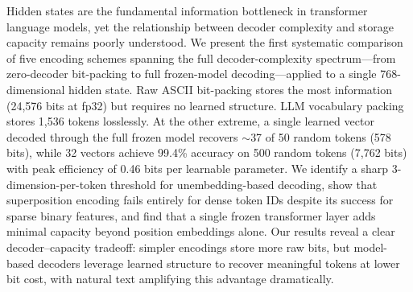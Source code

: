 Hidden states are the fundamental information bottleneck in transformer language models, yet the relationship between decoder complexity and storage capacity remains poorly understood. We present the first systematic comparison of five encoding schemes spanning the full decoder-complexity spectrum---from zero-decoder bit-packing to full frozen-model decoding---applied to a single 768-dimensional \gptwo hidden state. Raw ASCII bit-packing stores the most information (24,576 bits at fp32) but requires no learned structure. LLM vocabulary packing stores 1,536 tokens losslessly. At the other extreme, a single learned \memvec vector decoded through the full frozen \gptwo model recovers $\sim$37 of 50 random tokens (578 bits), while 32 \memvec vectors achieve 99.4\% accuracy on 500 random tokens (7,762 bits) with peak efficiency of 0.46 bits per learnable parameter. We identify a sharp 3-dimension-per-token threshold for unembedding-based decoding, show that superposition encoding fails entirely for dense token IDs despite its success for sparse binary features, and find that a single frozen transformer layer adds minimal capacity beyond position embeddings alone. Our results reveal a clear decoder--capacity tradeoff: simpler encodings store more raw bits, but model-based decoders leverage learned structure to recover meaningful tokens at lower bit cost, with natural text amplifying this advantage dramatically.
